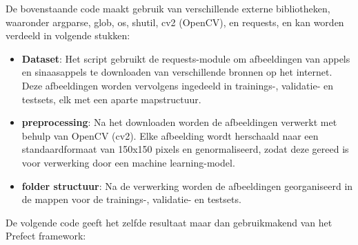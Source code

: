 De bovenstaande code maakt gebruik van verschillende externe bibliotheken, waaronder argparse, glob, os, shutil, cv2 (OpenCV), en requests, en kan worden verdeeld in volgende stukken:

\begin{itemize}
    \item \textbf{Dataset}: Het script gebruikt de requests-module om afbeeldingen van appels en sinaasappels te downloaden van verschillende bronnen op het internet. Deze afbeeldingen worden vervolgens ingedeeld in trainings-, validatie- en testsets, elk met een aparte mapstructuur.
    
    \item \textbf{preprocessing}: Na het downloaden worden de afbeeldingen verwerkt met behulp van OpenCV (cv2). Elke afbeelding wordt herschaald naar een standaardformaat van 150x150 pixels en genormaliseerd, zodat deze gereed is voor verwerking door een machine learning-model.
    
    \item \textbf{folder structuur}: Na de verwerking worden de afbeeldingen georganiseerd in de mappen voor de trainings-, validatie- en testsets.
\end{itemize}

De volgende code geeft het zelfde resultaat maar dan gebruikmakend van het Prefect framework:

